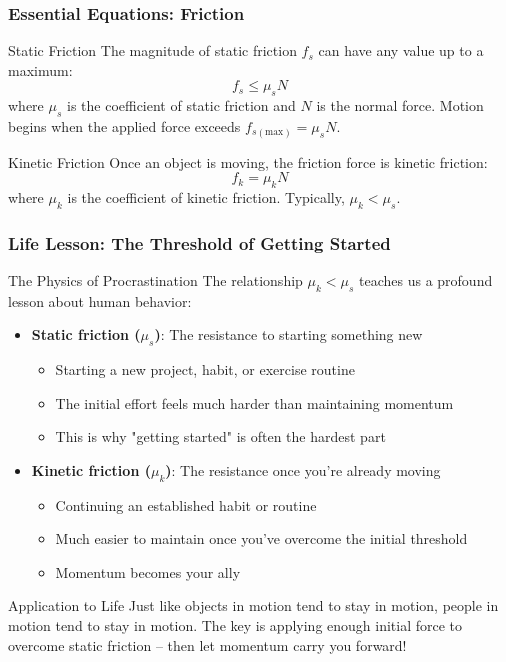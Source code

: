 \documentclass{beamer}
\begin{document}
\begin{frame}
\frametitle{Essential Equations: Friction}
\begin{alertblock}{Static Friction}
The magnitude of static friction $f_s$ can have any value up to a maximum:
\[ f_s \leq \mu_s N \]
where $\mu_s$ is the coefficient of static friction and $N$ is the normal force. Motion begins when the applied force exceeds $f_{s(\text{max})} = \mu_s N$.
\end{alertblock} \pause

\begin{exampleblock}{Kinetic Friction}
Once an object is moving, the friction force is kinetic friction:
\[ f_k = \mu_k N \]
where $\mu_k$ is the coefficient of kinetic friction. Typically, $\mu_k < \mu_s$.
\end{exampleblock}
\end{frame}

\begin{frame}
\frametitle{Life Lesson: The Threshold of Getting Started}
\begin{alertblock}{The Physics of Procrastination}
The relationship $\mu_k < \mu_s$ teaches us a profound lesson about human behavior:
\begin{itemize}
    \item \textbf{Static friction ($\mu_s$)}: The resistance to starting something new
    \begin{itemize}
        \item Starting a new project, habit, or exercise routine
        \item The initial effort feels much harder than maintaining momentum
        \item This is why "getting started" is often the hardest part
    \end{itemize} \pause
    \item \textbf{Kinetic friction ($\mu_k$)}: The resistance once you're already moving
    \begin{itemize}
        \item Continuing an established habit or routine
        \item Much easier to maintain once you've overcome the initial threshold
        \item Momentum becomes your ally
    \end{itemize}
\end{itemize}
\end{alertblock} \pause

\begin{exampleblock}{Application to Life}
Just like objects in motion tend to stay in motion, people in motion tend to stay in motion. The key is applying enough initial force to overcome static friction -- then let momentum carry you forward!
\end{exampleblock}
\end{frame}
\end{document}
